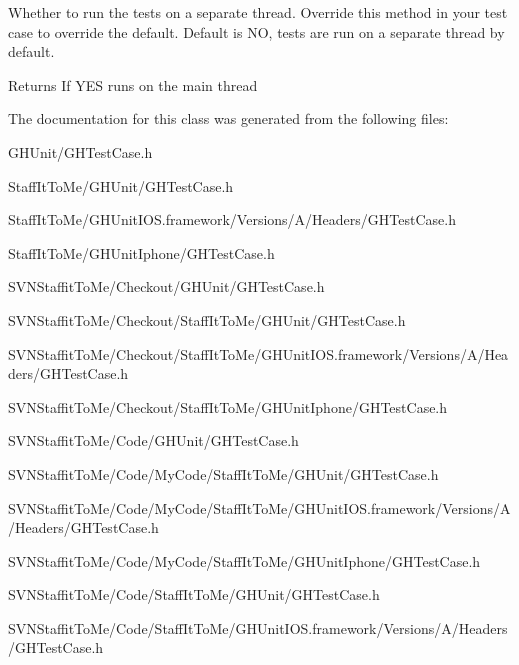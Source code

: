 \label{interface_g_h_test_case_a08b9bcb2d874b7785918457257446066}
\-Whether to run the tests on a separate thread. \-Override this method in your test case to override the default. \-Default is \-N\-O, tests are run on a separate thread by default. \begin{DoxyReturn}{\-Returns}
\-If \-Y\-E\-S runs on the main thread 
\end{DoxyReturn}


\-The documentation for this class was generated from the following files\-:\begin{DoxyCompactItemize}
\item 
\-G\-H\-Unit/\-G\-H\-Test\-Case.\-h\item 
\-Staff\-It\-To\-Me/\-G\-H\-Unit/\-G\-H\-Test\-Case.\-h\item 
\-Staff\-It\-To\-Me/\-G\-H\-Unit\-I\-O\-S.\-framework/\-Versions/\-A/\-Headers/\-G\-H\-Test\-Case.\-h\item 
\-Staff\-It\-To\-Me/\-G\-H\-Unit\-Iphone/\-G\-H\-Test\-Case.\-h\item 
\-S\-V\-N\-Staffit\-To\-Me/\-Checkout/\-G\-H\-Unit/\-G\-H\-Test\-Case.\-h\item 
\-S\-V\-N\-Staffit\-To\-Me/\-Checkout/\-Staff\-It\-To\-Me/\-G\-H\-Unit/\-G\-H\-Test\-Case.\-h\item 
\-S\-V\-N\-Staffit\-To\-Me/\-Checkout/\-Staff\-It\-To\-Me/\-G\-H\-Unit\-I\-O\-S.\-framework/\-Versions/\-A/\-Headers/\-G\-H\-Test\-Case.\-h\item 
\-S\-V\-N\-Staffit\-To\-Me/\-Checkout/\-Staff\-It\-To\-Me/\-G\-H\-Unit\-Iphone/\-G\-H\-Test\-Case.\-h\item 
\-S\-V\-N\-Staffit\-To\-Me/\-Code/\-G\-H\-Unit/\-G\-H\-Test\-Case.\-h\item 
\-S\-V\-N\-Staffit\-To\-Me/\-Code/\-My\-Code/\-Staff\-It\-To\-Me/\-G\-H\-Unit/\-G\-H\-Test\-Case.\-h\item 
\-S\-V\-N\-Staffit\-To\-Me/\-Code/\-My\-Code/\-Staff\-It\-To\-Me/\-G\-H\-Unit\-I\-O\-S.\-framework/\-Versions/\-A/\-Headers/\-G\-H\-Test\-Case.\-h\item 
\-S\-V\-N\-Staffit\-To\-Me/\-Code/\-My\-Code/\-Staff\-It\-To\-Me/\-G\-H\-Unit\-Iphone/\-G\-H\-Test\-Case.\-h\item 
\-S\-V\-N\-Staffit\-To\-Me/\-Code/\-Staff\-It\-To\-Me/\-G\-H\-Unit/\-G\-H\-Test\-Case.\-h\item 
\-S\-V\-N\-Staffit\-To\-Me/\-Code/\-Staff\-It\-To\-Me/\-G\-H\-Unit\-I\-O\-S.\-framework/\-Versions/\-A/\-Headers/\-G\-H\-Test\-Case.\-h\item 

\end{DoxyCompactItemize}
